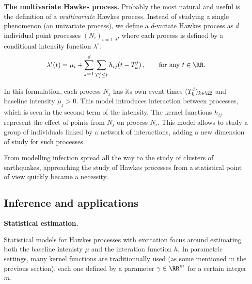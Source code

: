     \textbf{The multivariate Hawkes process.} Probably the most natural and useful is the definition of a \emph{multivariate} Hawkes process. 
    Instead of studying a single phenomenon (an univariate process), we define a $d$-variate Hawkes process as $d$ individual point processes $(N_i)_{i=1:d}$, 
    where each process is defined by a conditional intensity function $\lambda^i$:
    \[\lambda^i(t) = \mu_i + \sum_{j=1}^{d}\sum_{T_k^j \leq t}{h_{ij}(t-T_k^j)}\,, \qquad \text{for any $t\in\RR$.}\]

    In this formulation, each process $N_j$ has its own event times $(T_k^j)_{k\in\ZZ}$ and baseline intensity $\mu_j > 0$.
    This model introduces interaction between processes, which is seen in the second term of the intensity.
    The kernel functions $h_{ij}$ represent the effect of points from $N_j$ on process $N_i$.
    This model allows to study a group of individuals linked by a network of interactions, adding a new dimension of study for such processes.

    From modelling infection spread all the way to the study of clusters of earthquakes, approaching the study of Hawkes processes from a statistical point of view quickly became a necessity.

    \subsection{Inference and applications}

    \textbf{Statistical estimation.}
    
    Statistical models for Hawkes processes with excitation focus around estimating both the baseline intenisty $\mu$ and the interation function $h$.
    In parametric settings, many kernel functions are traditionnally used (as some mentioned in the previous section),
    each one defined by a parameter $\gamma\in\RR^m$ for a certain integer $m$.


